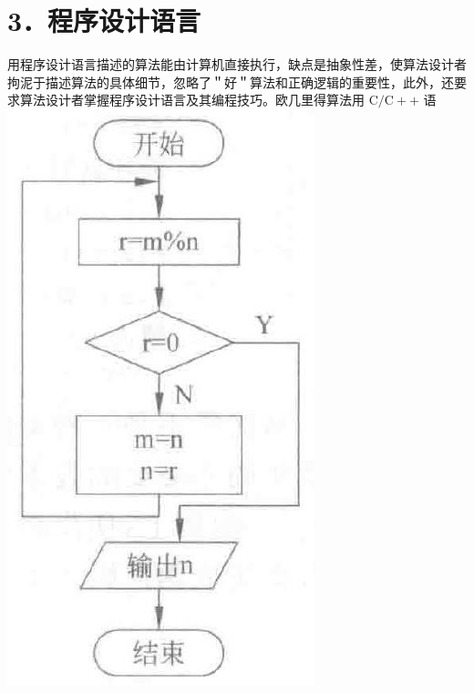 \documentclass[10pt]{article}
\begin{document}
\section*{3．程序设计语言}
用程序设计语言描述的算法能由计算机直接执行，缺点是抽象性差，使算法设计者拘泥于描述算法的具体细节，忽略了＂好＂算法和正确逻辑的重要性，此外，还要求算法设计者掌握程序设计语言及其编程技巧。欧几里得算法用 $\mathrm{C} / \mathrm{C}++$ 语\\
\includegraphics[max width=\textwidth, center]{2025_06_06_704745ea57b15b2333e5g-028}
\end{document}
